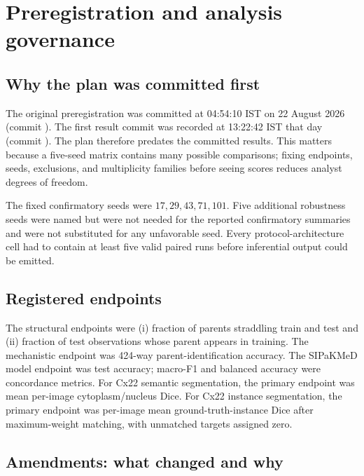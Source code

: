 \documentclass[11pt,oneside]{report}
\newcommand{\artifact}[1]{\path{#1}}
\begin{document}
\chapter{Preregistration and analysis governance}

\section{Why the plan was committed first}

The original preregistration was committed at 04:54:10 IST on 22 August 2026 (commit \artifact{67e8ded}). The first result commit was recorded at 13:22:42 IST that day (commit \artifact{1c2da7f}). The plan therefore predates the committed results. This matters because a five-seed matrix contains many possible comparisons; fixing endpoints, seeds, exclusions, and multiplicity families before seeing scores reduces analyst degrees of freedom.

The fixed confirmatory seeds were $17,29,43,71,101$. Five additional robustness seeds were named but were not needed for the reported confirmatory summaries and were not substituted for any unfavorable seed. Every protocol-architecture cell had to contain at least five valid paired runs before inferential output could be emitted.

\section{Registered endpoints}

The structural endpoints were (i) fraction of parents straddling train and test and (ii) fraction of test observations whose parent appears in training. The mechanistic endpoint was 424-way parent-identification accuracy. The SIPaKMeD model endpoint was test accuracy; macro-F1 and balanced accuracy were concordance metrics. For Cx22 semantic segmentation, the primary endpoint was mean per-image cytoplasm/nucleus Dice. For Cx22 instance segmentation, the primary endpoint was per-image mean ground-truth-instance Dice after maximum-weight matching, with unmatched targets assigned zero.

\section{Amendments: what changed and why}
\end{document}
